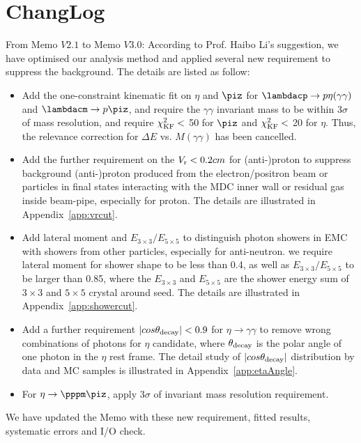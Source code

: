 \section{ChangLog}

From Memo $V2.1$ to Memo $V3.0$:
    According to Prof. Haibo Li's suggestion, we have optimised our analysis method and applied several new requirement to suppress the background. The details are listed as follow:
  \begin{itemize}
    \item Add the one-constraint kinematic fit on $\eta$ and $\piz$ for $\lambdacp\to p\eta(\gamma\gamma)$ and $\lambdacm \to p\piz$, and require the $\gamma\gamma$ invariant mass to be within $3\sigma$ of mass resolution, and require $\chi_{\rm{KF}}^2<$ 50 for $\piz$ and $\chi_{\rm{KF}}^2<$ 20 for $\eta$. Thus, the relevance correction for $\Delta E$ vs. $M(\gamma\gamma)$ has been cancelled.
    \item Add the further requirement on the $V_{\rm{r}}<0.2cm$ for (anti-)proton to suppress background (anti-)proton produced from the electron/positron beam or particles in final states interacting with the MDC inner wall or residual gas inside beam-pipe, especially for proton. The details are illustrated in Appendix~\ref{app:vrcut}.
    \item Add lateral moment and $E_{3\times3}/E_{5\times5}$ to distinguish photon showers in EMC with showers from other particles, especially for anti-neutron. we require lateral moment for shower shape to be less than 0.4, as well as $E_{3\times3}/E_{5\times5}$ to be larger than 0.85, where the $E_{3\times3}$ and $E_{5\times5}$ are the shower energy sum of $3\times3$ and $5\times5$ crystal around seed. The details are illustrated in Appendix~\ref{app:showercut}.
    \item Add a further requirement $|cos\theta_{\rm{decay}}|<0.9$ for $\eta\to\gamma\gamma$ to remove wrong combinations of photons for $\eta$ candidate, where $\theta_{\rm{decay}}$ is the polar angle of one photon in the $\eta$ rest frame. The detail study of $|cos\theta_{\rm{decay}}|$ distribution by data and MC samples is illustrated in Appendix~\ref{app:etaAngle}.
    \item For $\eta\to\pppm\piz$, apply $3\sigma$ of invariant mass resolution requirement.
  \end{itemize}
    We have updated the Memo with these new requirement, fitted results, systematic errors and I/O check. 